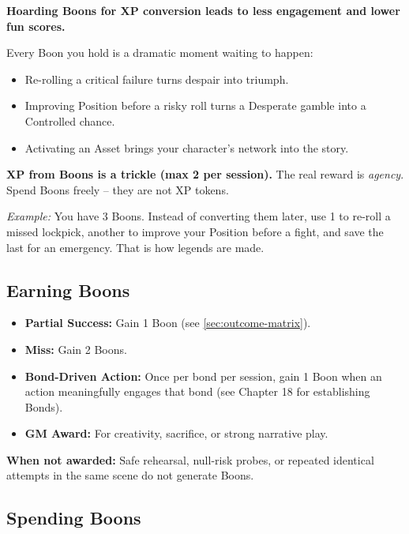 \begin{tcolorbox}[colback=green!5!white,colframe=green!70!black,title=\textbf{Why You Should Spend Boons -- The Math of Fun},breakable]
\textbf{Hoarding Boons for XP conversion leads to less engagement and lower fun scores.}

\medskip
\noindent Every Boon you hold is a dramatic moment waiting to happen:
\begin{itemize}
  \item Re-rolling a critical failure turns despair into triumph.
  \item Improving Position before a risky roll turns a Desperate gamble into a Controlled chance.
  \item Activating an Asset brings your character's network into the story.
\end{itemize}
\textbf{XP from Boons is a trickle (max 2 per session).} The real reward is \textit{agency}. Spend Boons freely -- they are not XP tokens.

\medskip
\noindent \textit{Example:} You have 3 Boons. Instead of converting them later, use 1 to re-roll a missed lockpick, another to improve your Position before a fight, and save the last for an emergency. That is how legends are made.
\end{tcolorbox}

\subsection{Earning Boons}
\label{sec:earning-boons}

\begin{itemize}
  \item \textbf{Partial Success:} Gain 1 Boon (see \ref{sec:outcome-matrix}).
  \item \textbf{Miss:} Gain 2 Boons.
  \item \textbf{Bond-Driven Action:} Once per bond per session, gain 1 Boon when an action meaningfully engages that bond (see Chapter 18 for establishing Bonds).
  \item \textbf{GM Award:} For creativity, sacrifice, or strong narrative play.
\end{itemize}

\noindent \textbf{When not awarded:} Safe rehearsal, null-risk probes, or repeated identical attempts in the same scene do not generate Boons.

\subsection{Spending Boons}
\label{sec:spending-boons}


